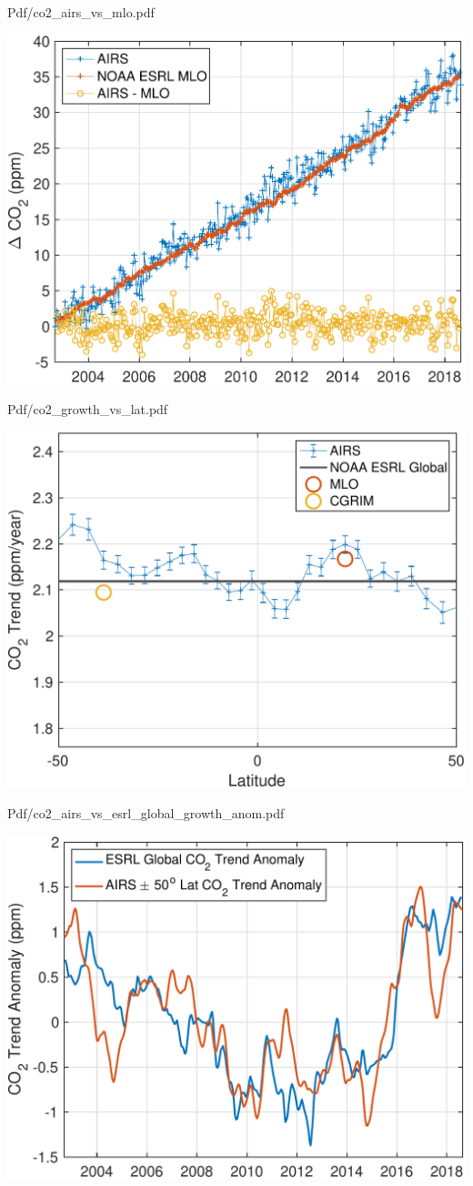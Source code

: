 \documentclass[presentation]{beamer}
\begin{document}
\begin{frame}[label={sec:orgcc46bf7}]{Pdf/co2\_airs\_vs\_mlo.pdf}
\begin{center}
\includegraphics[width=0.7\linewidth]{./Figs/Pdf/co2_airs_vs_mlo.pdf}
\end{center}
\end{frame}

\begin{frame}[label={sec:org68e92a5}]{Pdf/co2\_growth\_vs\_lat.pdf}
\begin{center}
\includegraphics[width=0.7\linewidth]{./Figs/Pdf/co2_growth_vs_lat.pdf}
\end{center}
\end{frame}

\begin{frame}[label={sec:orge50cd3d}]{Pdf/co2\_airs\_vs\_esrl\_global\_growth\_anom.pdf}
\begin{center}
\includegraphics[width=0.7\linewidth]{./Figs/Pdf/co2_airs_vs_esrl_global_growth_anom.pdf}
\end{center}
\end{frame}
\end{document}
